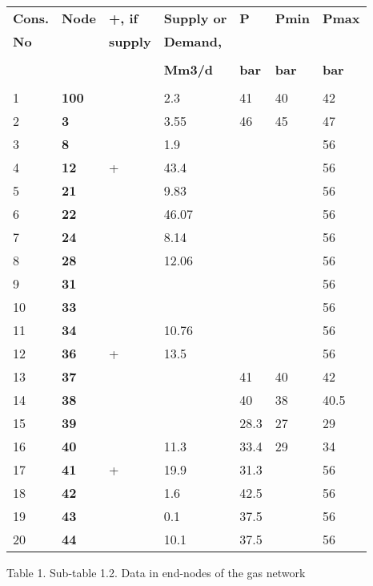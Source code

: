 \documentclass{article}
\begin{document}
\begin{tabular}{lllllll}
\textbf{Cons.} & \textbf{Node} & \textbf{+, if } & \textbf{Supply or } & 
\textbf{P} & \textbf{Pmin} & \textbf{Pmax} \\ 
\textbf{No} &  & \textbf{supply} & \textbf{Demand,} &  &  &  \\ 
&  &  &  &  &  &  \\ 
&  &  & \textbf{Mm3/d} & \textbf{bar} & \textbf{bar} & \textbf{bar} \\ 
&  &  &  &  &  &  \\ 
1 & \textbf{100} &  & 2.3 & 41 & 40 & 42 \\ 
2 & \textbf{3} &  & 3.55 & 46 & 45 & 47 \\ 
3 & \textbf{8} &  & 1.9 &  &  & 56 \\ 
4 & \textbf{12} & + & 43.4 &  &  & 56 \\ 
5 & \textbf{21} &  & 9.83 &  &  & 56 \\ 
6 & \textbf{22} &  & 46.07 &  &  & 56 \\ 
7 & \textbf{24} &  & 8.14 &  &  & 56 \\ 
8 & \textbf{28} &  & 12.06 &  &  & 56 \\ 
9 & \textbf{31} &  &  &  &  & 56 \\ 
10 & \textbf{33} &  &  &  &  & 56 \\ 
11 & \textbf{34} &  & 10.76 &  &  & 56 \\ 
12 & \textbf{36} & + & 13.5 &  &  & 56 \\ 
13 & \textbf{37} &  &  & 41 & 40 & 42 \\ 
14 & \textbf{38} &  &  & 40 & 38 & 40.5 \\ 
15 & \textbf{39} &  &  & 28.3 & 27 & 29 \\ 
16 & \textbf{40} &  & 11.3 & 33.4 & 29 & 34 \\ 
17 & \textbf{41} & + & 19.9 & 31.3 &  & 56 \\ 
18 & \textbf{42} &  & 1.6 & 42.5 &  & 56 \\ 
19 & \textbf{43} &  & 0.1 & 37.5 &  & 56 \\ 
20 & \textbf{44} &  & 10.1 & 37.5 &  & 56\end{tabular}

\bigskip


\bigskip

\newpage

\bigskip

Table 1. Sub-table 1.2. Data in end-nodes of the gas network

\bigskip
\end{document}
